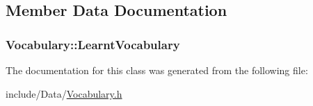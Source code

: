 \subsection{Member Data Documentation}
\hypertarget{class_vocabulary_a773229c5a76412765f5e486c287bea88}{
\subsubsection[{Learnt\-Vocabulary}]{ Vocabulary\-::\-Learnt\-Vocabulary}}\label{class_vocabulary_a773229c5a76412765f5e486c287bea88}


The documentation for this class was generated from the following file\-:\begin{DoxyCompactItemize}
\item 
include/\-Data/\hyperlink{_vocabulary_8h}{Vocabulary.\-h}\end{DoxyCompactItemize}
